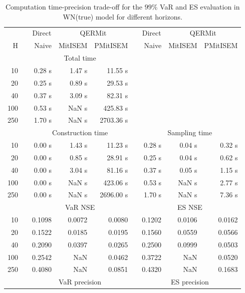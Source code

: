 \footnotesize{  
{ \renewcommand{\arraystretch}{1.3} 
\begin{longtable}{rr rrr r rrr}  
\caption{Computation time-precision trade-off for the  $99\%$ VaR and ES evaluation in WN(true) model for different horizons.} 
\label{tab:time_precision_WN_ML} \\ 
 & & \multicolumn{1}{c}{Direct} & \multicolumn{2}{c}{QERMit}&  & \multicolumn{1}{c}{Direct} & \multicolumn{2}{c}{QERMit} \\ \cline{3-5} \cline{7-9} 
 H & & Naive & MitISEM & PMitISEM & & Naive & MitISEM & PMitISEM \\ \hline 
 & & \multicolumn{3}{c}{Total time}  \\ \cline{3-5} 
10 & & 0.28 s & 1.47 s & 11.55 s  \\ 
20 & & 0.25 s & 0.89 s & 29.53 s  \\ 
40 & & 0.37 s & 3.09 s & 82.31 s  \\ 
100 & & 0.53 s &  NaN s & 425.83 s  \\ 
250 & & 1.70 s &  NaN s & 2703.36 s  \\ 
\hline 
 & & \multicolumn{3}{c}{Construction time} & & \multicolumn{3}{c}{ Sampling time} \\ \cline{3-5}  \cline{7-9}
10 & & 0.00 s & 1.43 s & 11.23 s &&  0.28 s & 0.04 s & 0.32 s \\ 
20 & & 0.00 s & 0.85 s & 28.91 s &&  0.25 s & 0.04 s & 0.62 s \\ 
40 & & 0.00 s & 3.04 s & 81.16 s &&  0.37 s & 0.05 s & 1.15 s \\ 
100 & & 0.00 s &  NaN s & 423.06 s &&  0.53 s &  NaN s & 2.77 s \\ 
250 & & 0.00 s &  NaN s & 2696.00 s &&  1.70 s &  NaN s & 7.36 s \\ 
\hline 
 & & \multicolumn{3}{c}{VaR NSE} &&  \multicolumn{3}{c}{ES NSE} \\ \cline{3-5}  \cline{7-9}
10 && 0.1098  & 0.0072  & 0.0080 && 0.1202  & 0.0106  & 0.0162  \\ 
20 && 0.1522  & 0.0185  & 0.0195 && 0.1560  & 0.0559  & 0.0566  \\ 
40 && 0.2090  & 0.0397  & 0.0265 && 0.2500  & 0.0999  & 0.0503  \\ 
100 && 0.2542  &    NaN  & 0.0462 && 0.3722  &    NaN  & 0.0520  \\ 
250 && 0.4080  &    NaN  & 0.0851 && 0.4320  &    NaN  & 0.1683  \\ 
\hline 
 & & \multicolumn{3}{c}{VaR precision} &&  \multicolumn{3}{c}{ES precision} \\ \cline{3-5}  \cline{7-9}

\end{longtable}}}
